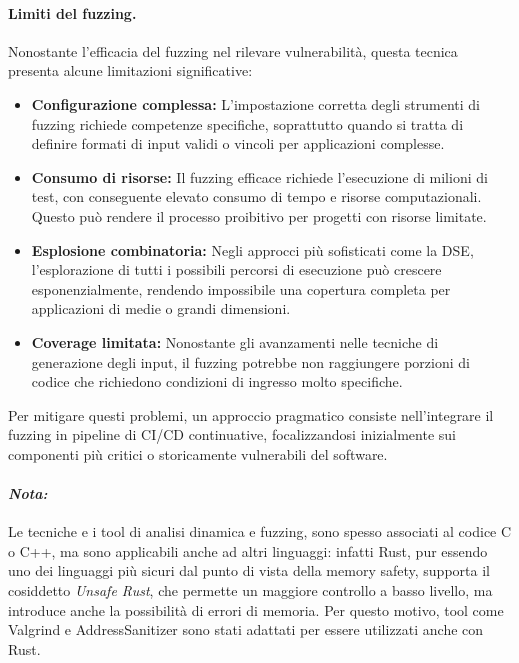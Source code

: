 \paragraph{Limiti del fuzzing.}
Nonostante l'efficacia del fuzzing nel rilevare vulnerabilità, questa tecnica presenta
alcune limitazioni significative:

\begin{itemize}
  \item \textbf{Configurazione complessa:} L'impostazione corretta degli
    strumenti di fuzzing richiede competenze specifiche, soprattutto quando si tratta
    di definire formati di input validi o vincoli per applicazioni complesse.

  \item \textbf{Consumo di risorse:} Il fuzzing efficace richiede l'esecuzione
    di milioni di test, con conseguente elevato consumo di tempo e risorse computazionali.
    Questo può rendere il processo proibitivo per progetti con risorse limitate.

  \item \textbf{Esplosione combinatoria:} Negli approcci più sofisticati come la
    DSE, l'esplorazione di tutti i possibili percorsi di esecuzione può crescere
    esponenzialmente, rendendo impossibile una copertura completa per
    applicazioni di medie o grandi dimensioni.

  \item \textbf{Coverage limitata:} Nonostante gli avanzamenti nelle tecniche di
    generazione degli input, il fuzzing potrebbe non raggiungere porzioni di codice
    che richiedono condizioni di ingresso molto specifiche.
\end{itemize}

Per mitigare questi problemi, un approccio pragmatico consiste nell'integrare il
fuzzing in pipeline di CI/CD continuative, focalizzandosi inizialmente sui
componenti più critici o storicamente vulnerabili del software.

\noindent

\paragraph{\textit{Nota:}}
Le tecniche e i tool di analisi dinamica e fuzzing, sono spesso associati al codice
C o C++, ma sono applicabili anche ad altri linguaggi: infatti Rust, pur essendo
uno dei linguaggi più sicuri dal punto di vista della memory safety, supporta il
cosiddetto \textit{Unsafe Rust}, che permette un maggiore controllo a basso livello,
ma introduce anche la possibilità di errori di memoria. Per questo motivo, tool
come Valgrind e AddressSanitizer sono stati adattati per essere utilizzati anche
con Rust.\cite{valgrind_rust}\cite{rust_manual_san}
